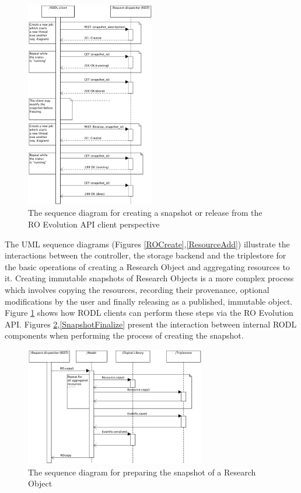 \begin{figure}[!h]
\centering
\includegraphics[width=0.5\textwidth]{Figures/RODL/SnapshotClient.png}
\caption{The sequence diagram for creating a snapshot or release from the RO Evolution API client perspective}
\label{SnapshotClient}
\end{figure}


The UML sequence diagrams (Figures \ref{ROCreate},\ref{ResourceAdd}) illustrate the interactions between the controller, the storage backend and the triplestore for the basic operations of creating a Research Object and aggregating resources to it. Creating immutable snapshots of Research Objects is a more complex process which involves copying the resources, recording their provenance, optional modifications by the user and finally releasing as a published, immutable object. Figure \ref{SnapshotClient} shows how RODL clients can perform these steps via the RO Evolution API. Figures \ref{SnapshotPerform},\ref{SnapshotFinalize} present the interaction between internal RODL components when performing the process of creating the snapshot.

\begin{figure}[!h]
\centering
\includegraphics[width=0.7\textwidth]{Figures/RODL/SnapshotPerform.png}
\caption{The sequence diagram for preparing the snapshot of a Research Object}
\label{SnapshotPerform}
\end{figure}

